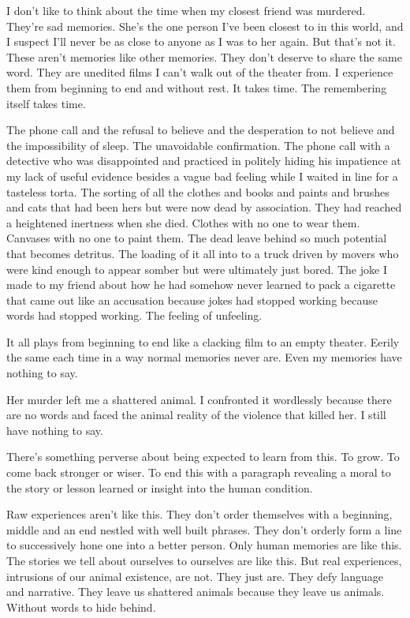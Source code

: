 \documentclass[12pt, oneside]{memoir}
\begin{document}
I don’t like to think about the time when my closest friend was murdered. 
They’re sad memories.
She's the one person I've been closest to in this world, and I suspect
I'll never be as close to anyone as I was to her again.
But that’s not it. 
These aren’t memories like other memories.
They don’t deserve to share the same word. 
They are unedited films I can’t walk out of the theater from. 
I experience them from beginning to end and without rest. 
It takes time. 
The remembering itself takes time. 

The phone call and the refusal to believe and the desperation to not
believe and the impossibility of sleep. 
The unavoidable confirmation. 
The phone call with a detective who was disappointed and practiced in
politely hiding his impatience at my lack of useful evidence besides a
vague bad feeling while I waited in line for a tasteless torta.
The sorting of all the clothes and books and paints and brushes and
cats that had been hers but were now dead by association.  
They had reached a heightened inertness when she died. 
Clothes with no one to wear them. 
Canvases with no one to paint them. 
The dead leave behind so much potential that becomes detritus. 
The loading of it all into to a truck driven by movers who were kind
enough to appear somber but were ultimately just bored.
The joke I made to my friend about how he had somehow never learned to
pack a cigarette that came out like an accusation because jokes had
stopped working because words had stopped working.
The feeling of unfeeling. 

It all plays from beginning to end like a clacking film to an empty
theater.
Eerily the same each time in a way normal memories never are.
Even my memories have nothing to say.

Her murder left me a shattered animal.
I confronted it wordlessly because there are no words and faced the
animal reality of the violence that killed her.
I still have nothing to say.

There’s something perverse about being expected to learn from this. 
To grow. 
To come back stronger or wiser. 
To end this with a paragraph revealing a moral to the story or lesson
learned or insight into the human condition.

Raw experiences aren't like this. 
They don't order themselves with a beginning, middle and an end
nestled with well built phrases.
They don’t orderly form a line to successively hone one into a better
person.
Only human memories are like this. 
The stories we tell about ourselves to ourselves are like this. 
But real experiences, intrusions of our animal existence, are not. 
They just are. 
They defy language and narrative. 
They leave us shattered animals because they leave us animals. 
Without words to hide behind. 
\end{document}
